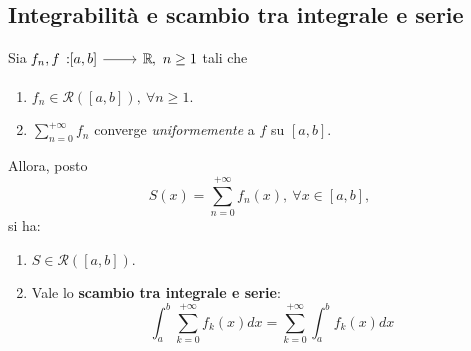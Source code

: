 \subsection{Integrabilità e scambio tra integrale e serie}
\begin{theorema}
	Sia $\funz{f_n,f}{\left[a,b\right]}{\realset},\ n\geq 1$ tali che
	\begin{enumerate}
		\item $f_n\in\mathcal{R}\left(\left[a,b\right]\right),\ \forall n\geq 1$.
		\item $\displaystyle\sum_{n=0}^{+\infty}f_n$ converge \textit{uniformemente} a $f$ su $\left[a,b\right]$.
	\end{enumerate}
	Allora, posto
	\begin{equation*}
		 S(x)=\sum_{n=0}^{+\infty}f_n(x),\ \forall x\in \left[a,b\right],
	\end{equation*}
si ha:
	\begin{enumerate}
		\item $S\in\mathcal{R}\left(\left[a,b\right]\right)$.
		\item Vale lo \textbf{scambio tra integrale e serie}:
		\begin{equation}
			\int_{a}^{b}\sum_{k=0}^{+\infty}f_k(x)dx=\sum_{k=0}^{+\infty}\int_{a}^{b}f_k(x)dx
		\end{equation}
	\end{enumerate}
\end{theorema}
